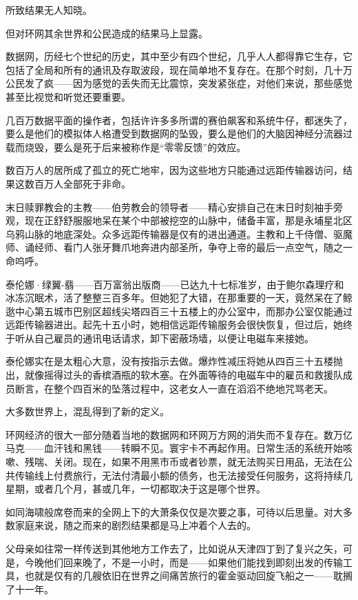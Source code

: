 \documentclass[AutoFakeBold=true]{book}
\begin{document}
所致结果无人知晓。

\vspace*{1em}

但对环网其余世界和公民造成的结果马上显露。

数据网，历经七个世纪的历史，其中至少有四个世纪，几乎人人都得靠它生存，它包括了全局和所有的通讯及存取波段，现在简单地不复存在。在那个时刻，几十万公民发了疯——因为感觉的丢失而无比震惊，突发紧张症，对他们来说，那些感觉甚至比视觉和听觉还要重要。

几百万数据平面的操作者，包括许许多多所谓的赛伯飙客和系统牛仔，都迷失了，要么是他们的模拟体人格遭受到数据网的坠毁，要么是他们的大脑因神经分流器过载而烧毁，要么是死于后来被称作是``零零反馈''的效应。

数百万人的居所成了孤立的死亡地牢，因为这些地方只能通过远距传输器访问，结果这数百万人全部死于非命。

末日赎罪教会的主教——伯劳教会的领导者——精心安排自己在末日时刻袖手旁观，现在正舒舒服服地呆在某个中部被挖空的山脉中，储备丰富，那是永埔星北区乌鸦山脉的地底深处。众多远距传输器是仅有的进出通道。主教和上千侍僧、驱魔师、诵经师、看门人张牙舞爪地奔进内部圣所，争夺上帝的最后一点空气，随之一命呜呼。

泰伦娜·绿翼-翡——百万富翁出版商——已达九十七标准岁，由于鲍尔森理疗和冰冻沉眠术，活了整整三百多年。但她犯了大错，在那重要的一天，竟然呆在了鲸逖中心第五城市巴别区超线尖塔四百三十五楼上的办公室中，而那办公室仅能通过远距传输器进出。起先十五小时，她相信远距传输服务会很快恢复，但过后，她终于听从自己雇员的通讯电话请求，卸下密蔽场墙，以便让电磁车来接她。

泰伦娜实在是太粗心大意，没有按指示去做。爆炸性减压将她从四百三十五楼抛出，就像摇得过头的香槟酒瓶的软木塞。在外面等待的电磁车中的雇员和救援队成员断言，在整个四百米的坠落过程中，这老女人一直在滔滔不绝地咒骂老天。

\vspace*{1em}

大多数世界上，混乱得到了新的定义。

环网经济的很大一部分随着当地的数据网和环网万方网的消失而不复存在。数万亿马克——血汗钱和黑钱——转瞬不见。寰宇卡不再起作用。日常生活的系统开始咳嗽、残喘、关闭。现在，如果不用黑市币或者钞票，就无法购买日用品，无法在公共传输线上付费旅行，无法付清最小额的债务，也无法接受任何服务，这将持续几星期，或者几个月，甚或几年，一切都取决于这是哪个世界。

如同海啸般席卷而来的全网上下的大萧条仅仅是次要之事，可待以后思量。对大多数家庭来说，随之而来的剧烈结果都是马上冲着个人去的。

父母亲如往常一样传送到其他地方工作去了，比如说从天津四丁到了复兴之矢，可是，今晚他们回来晚了，不是一小时，而是——如果他们能找到即刻出发的传输工具，也就是仅有的几艘依旧在世界之间痛苦旅行的霍金驱动回旋飞船之一——耽搁了十一年。
\end{document}
